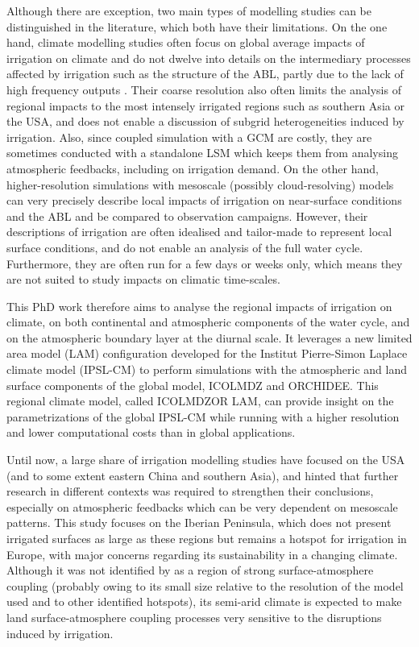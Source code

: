 Although there are exception, two main types of modelling studies can be distinguished in the literature, which both have their limitations.
On the one hand, climate modelling studies often focus on global average impacts of irrigation on climate and do not dwelve into details on the intermediary processes affected by irrigation such as the structure of the ABL, partly due to the lack of high frequency outputs \citep{findell_accurate_2024}. Their coarse resolution also often limits the analysis of regional impacts to the most intensely irrigated regions such as southern Asia or the USA, and does not enable a discussion of subgrid heterogeneities induced by irrigation. Also, since coupled simulation with a GCM are costly, they are sometimes conducted with a standalone LSM which keeps them from analysing atmospheric feedbacks, including on irrigation demand.
On the other hand, higher-resolution simulations with mesoscale (possibly cloud-resolving) models can very precisely describe local impacts of irrigation on near-surface conditions and the ABL and be compared to observation campaigns. However, their descriptions of irrigation are often idealised and tailor-made to represent local surface conditions, and do not enable an analysis of the full water cycle. Furthermore, they are often run for a few days or weeks only, which means they are not suited to study impacts on climatic time-scales.

This PhD work therefore aims to analyse the regional impacts of irrigation on climate, on both continental and atmospheric components of the water cycle, and on the atmospheric boundary layer at the diurnal scale.
It leverages a new limited area model (LAM) configuration developed for the Institut Pierre-Simon Laplace climate model (IPSL-CM) to perform simulations with the atmospheric and land surface components of the global model, ICOLMDZ and ORCHIDEE.
This regional climate model, called ICOLMDZOR LAM, can provide insight on the parametrizations of the global IPSL-CM while running with a higher resolution and lower computational costs than in global applications.

Until now, a large share of irrigation modelling studies have focused on the USA (and to some extent eastern China and southern Asia), and hinted that further research in different contexts was required to strengthen their conclusions, especially on atmospheric feedbacks which can be very dependent on mesoscale patterns.
This study focuses on the Iberian Peninsula, which does not present irrigated surfaces as large as these regions but remains a hotspot for irrigation in Europe, with major concerns regarding its sustainability in a changing climate.
Although it was not identified by \cite{koster_regions_2004} as a region of strong surface-atmosphere coupling (probably owing to its small size relative to the resolution of the model used and to other identified hotspots), its semi-arid climate is expected to make land surface-atmosphere coupling processes very sensitive to the disruptions induced by irrigation.

